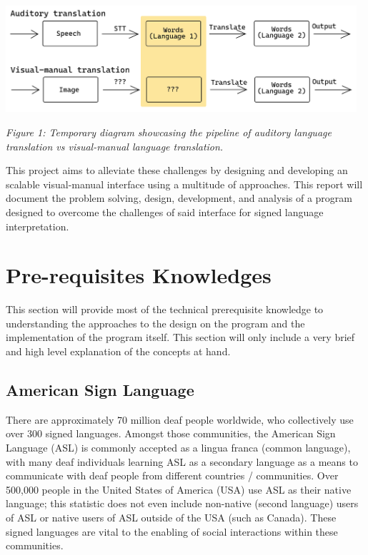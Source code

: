 \documentclass[11pt]{article}
\begin{document}
    \begin{center}
        \includegraphics[width=13cm]{audVsVM.png}
        \\
        \raggedright \textit{
        Figure 1: Temporary diagram showcasing the pipeline of auditory language translation vs visual-manual language translation.
        }
    \end{center}

    This project aims to alleviate these challenges by designing and developing an scalable visual-manual interface using a multitude of approaches. This report will document the problem solving, design, development, and analysis of a program designed to overcome the challenges of said interface for signed language interpretation.


\section{Pre-requisites Knowledges}
    This section will provide most of the technical prerequisite knowledge to understanding the approaches to the design on the program and the implementation of the program itself. This section will only include a very brief and high level explanation of the concepts at hand.

    \subsection{American Sign Language}
        There are approximately 70 million deaf people worldwide, who collectively use over 300 signed languages. Amongst those communities, the American Sign Language (ASL) is commonly accepted as a lingua franca (common language), with many deaf individuals learning ASL as a secondary language as a means to communicate with deaf people from different countries / communities. Over 500,000 people in the United States of America (USA) use ASL as their native language; this statistic does not even include non-native (second language) users of ASL or native users of ASL outside of the USA (such as Canada). These signed languages are vital to the enabling of social interactions within these communities. 
\end{document}

